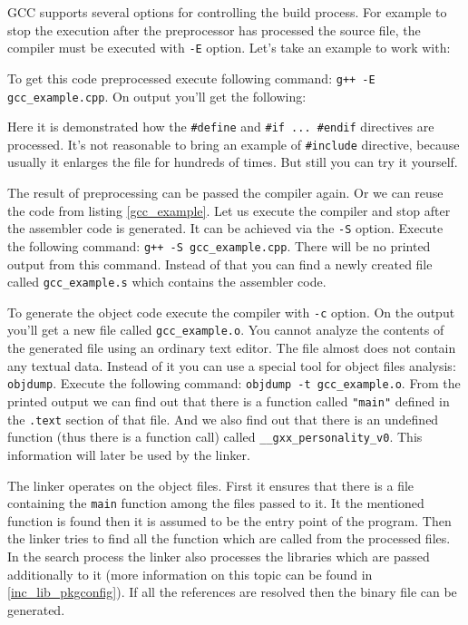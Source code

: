 GCC supports several options for controlling the build process. For example to stop the execution after the preprocessor has processed the source file, the compiler must be executed with {\tt -E} option. Let's take an example to work with: 



To get this code preprocessed execute following command: {\tt g++ -E gcc\_example.cpp}. On output you'll get the following:



Here it is demonstrated how the {\tt \#define} and {\tt \#if ... \#endif} directives are processed. It's not reasonable to bring an example of {\tt \#include} directive, because usually it enlarges the file for hundreds of times. But still you can try it yourself.

The result of preprocessing can be passed the compiler again. Or we can reuse the code from listing \ref{gcc_example}. Let us execute the compiler and stop after the assembler code is generated. It can be achieved via the {\tt -S} option. Execute the following command: {\tt g++ -S gcc\_example.cpp}. There will be no printed output from this command. Instead of that you can find a newly created file called {\tt gcc\_example.s} which contains the assembler code.

To generate the object code execute the compiler with {\tt -c} option. On the output you'll get a new file called {\tt gcc\_example.o}. You cannot analyze the contents of the generated file using an ordinary text editor. The file almost does not contain any textual data. Instead of it you can use a special tool for object files analysis: {\tt objdump}. Execute the following command: {\tt objdump -t gcc\_example.o}. From the printed output we can find out that there is a function called {\tt "main"} defined in the {\tt .text} section of that file. And we also find out that there is an undefined function (thus there is a function call) called {\tt \_\_gxx\_personality\_v0}. This information will later be used by the linker.

The linker operates on the object files. First it ensures that there is a file containing the {\tt main} function among the files passed to it. It the mentioned function is found then it is assumed to be the entry point of the program. Then the linker tries to find all the function which are called from the processed files. In the search process the linker also processes the libraries which are passed additionally to it (more information on this topic can be found in \ref {inc_lib_pkgconfig}). If all the references are resolved then the binary file can be generated.

